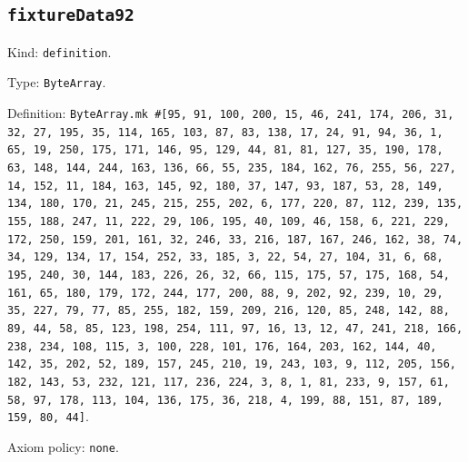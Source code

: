 \documentclass[11pt]{article}
\begin{document}
\subsection*{\texttt{fixtureData92}}
\noindent Kind: \texttt{definition}.\par
\noindent Type: \texttt{ByteArray}.\par
\noindent Definition: \texttt{ByteArray.mk \#[95, 91, 100, 200, 15, 46, 241, 174, 206, 31, 32, 27, 195, 35, 114, 165, 103, 87, 83, 138, 17, 24, 91, 94, 36, 1, 65, 19, 250, 175, 171, 146, 95, 129, 44, 81, 81, 127, 35, 190, 178, 63, 148, 144, 244, 163, 136, 66, 55, 235, 184, 162, 76, 255, 56, 227, 14, 152, 11, 184, 163, 145, 92, 180, 37, 147, 93, 187, 53, 28, 149, 134, 180, 170, 21, 245, 215, 255, 202, 6, 177, 220, 87, 112, 239, 135, 155, 188, 247, 11, 222, 29, 106, 195, 40, 109, 46, 158, 6, 221, 229, 172, 250, 159, 201, 161, 32, 246, 33, 216, 187, 167, 246, 162, 38, 74, 34, 129, 134, 17, 154, 252, 33, 185, 3, 22, 54, 27, 104, 31, 6, 68, 195, 240, 30, 144, 183, 226, 26, 32, 66, 115, 175, 57, 175, 168, 54, 161, 65, 180, 179, 172, 244, 177, 200, 88, 9, 202, 92, 239, 10, 29, 35, 227, 79, 77, 85, 255, 182, 159, 209, 216, 120, 85, 248, 142, 88, 89, 44, 58, 85, 123, 198, 254, 111, 97, 16, 13, 12, 47, 241, 218, 166, 238, 234, 108, 115, 3, 100, 228, 101, 176, 164, 203, 162, 144, 40, 142, 35, 202, 52, 189, 157, 245, 210, 19, 243, 103, 9, 112, 205, 156, 182, 143, 53, 232, 121, 117, 236, 224, 3, 8, 1, 81, 233, 9, 157, 61, 58, 97, 178, 113, 104, 136, 175, 36, 218, 4, 199, 88, 151, 87, 189, 159, 80, 44]}.\par
\noindent Axiom policy: \texttt{none}.\par
\end{document}
